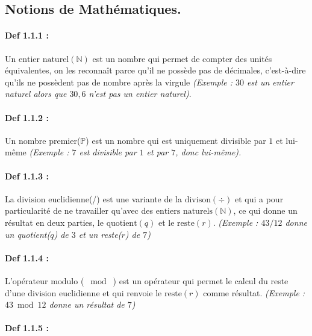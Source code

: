 \documentclass{article}
\begin{document}
\subsection{Notions de Mathématiques.}\label{notions-de-maths.}

\paragraph{Def 1.1.1 :}\label{def-1.1.1}

Un \(\text{entier naturel}(\mathbb{N})\) est un nombre qui permet de
compter des unités équivalentes, on les reconnaît parce qu'il ne possède
pas de décimales, c'est-à-dire qu'ils ne possèdent pas de nombre après
la virgule \textit{(Exemple : $30$ est un entier naturel alors que $30,6$
	n'est pas un entier naturel)}.

\paragraph{Def 1.1.2 :}\label{def-1.1.2}

Un nombre premier(\(\mathbb{P}\)) est un nombre qui est uniquement divisible par \(1\) et lui-même
\textit{(Exemple : $7$ est divisible par $1$ et par $7$, donc lui-même).}

\paragraph{Def 1.1.3 :}\label{def-1.1.3}

La \(\text{division euclidienne}\)(/) est une variante de la
\(\text{divison}(\div)\) et qui a pour particularité de ne travailler
qu'avec des \(\text{entiers naturels}(\mathbb{N})\), ce qui donne un
résultat en deux parties, le \(\text{quotient}(q)\) et le
\(\text{reste}(r)\). \textit{(Exemple : $43 / 12$ donne un quotient($q$) de $3$ et un reste($r$) de $7$)}

\paragraph{Def 1.1.4 :}\label{def-1.1.4}

L'opérateur \(\text{modulo}\) (\(\;\bmod\;\)) est un opérateur qui
permet le calcul du reste d'une \(\text{division euclidienne}\) et
qui renvoie le \(\text{reste}(r)\) comme résultat. \textit{(Exemple : $43 \bmod 12$ donne un résultat de $7$)}

\paragraph{Def 1.1.5 :}\label{def-1.1.5}
\end{document}
